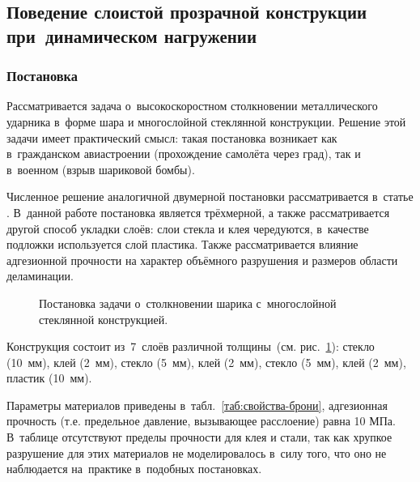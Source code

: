 \documentclass[thesis.tex]{subfiles}
\begin{document}
\subsection[Поведение слоистой прозрачной конструкции\\при~динамическом нагружении]{Поведение слоистой прозрачной конструкции при~динамическом нагружении}

\subsubsection{Постановка}

Рассматривается задача о~высокоскоростном столкновении металлического ударника в~форме шара и многослойной стеклянной
конструкции. Решение этой задачи имеет практический смысл: такая постановка возникает как в~гражданском авиастроении
(прохождение самолёта через град), так и в~военном (взрыв шариковой бомбы).

Численное решение аналогичной двумерной постановки рассматривается в~статье \cite{петров2003численное}. В~данной работе
постановка является трёхмерной, а также рассматривается другой способ укладки слоёв: слои стекла и клея чередуются,
в~качестве подложки используется слой пластика. Также рассматривается влияние адгезионной прочности на характер
объёмного разрушения и размеров области деламинации.

\begin{figure}[h]
    \begin{center}
        
    \end{center}
    \caption{Постановка задачи о~столкновении шарика с~многослойной стеклянной конструкцией.}
    \label{рис:броня}
\end{figure}

Конструкция состоит из~7~слоёв различной толщины~(см. рис.~\ref{рис:броня}): стекло (10~мм), клей (2~мм),
стекло (5~мм), клей (2~мм), стекло (5~мм), клей (2~мм), пластик (10~мм).

Параметры материалов приведены в~табл.~\ref{таб:свойства-брони}, адгезионная прочность (т.е. предельное давление,
вызывающее расслоение) равна 10 МПа. В~таблице отсутствуют пределы прочности для клея и стали, так
как хрупкое разрушение для этих материалов не моделировалось в~силу того, что оно не наблюдается на~практике в~подобных
постановках.
\end{document}
